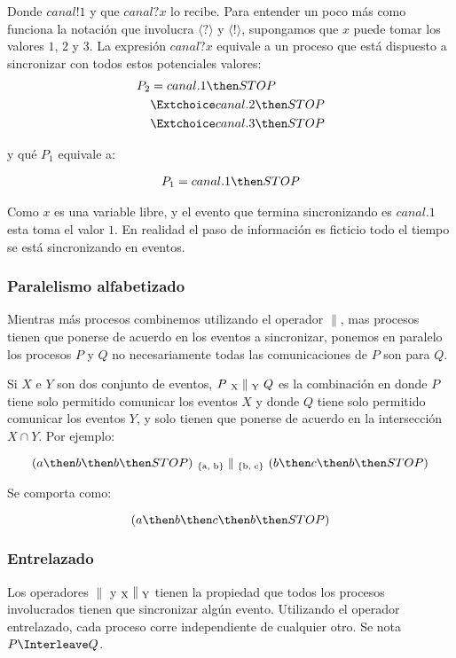 Donde $canal!1$ y que $canal?x$ lo recibe. Para entender un poco más como funciona la notación que involucra $\langle ? \rangle$ y $\langle ! \rangle$, supongamos que $x$ puede tomar los valores $1$, $2$ y $3$. La expresión $canal?x$ equivale a un proceso que está dispuesto a sincronizar con todos estos potenciales valores:
\begin{align*}
P_2 & =  canal.1 \then STOP \\
      & \Extchoice canal.2 \then STOP \\
      & \Extchoice canal.3 \then STOP 
\end{align*}

y qué $P_1$ equivale a: 

\begin{align*}
P_1  = canal.1 \then STOP \\
\end{align*}

Como $x$ es una variable libre, y el evento que termina sincronizando es $canal.1$ esta toma el valor $1$. En realidad el paso de información es ficticio todo el tiempo se está sincronizando en eventos.

\subsubsection*{Paralelismo alfabetizado}

Mientras más procesos combinemos utilizando el operador $\parallel$, mas procesos tienen que ponerse de acuerdo en los eventos a sincronizar, ponemos en paralelo los procesos $P$ y $Q$ no necesariamente todas las comunicaciones de $P$ son para $Q$.

Si $X$ e $Y$ son dos conjunto de eventos, $P\ \textsubscript{X}\parallel\textsubscript{Y}\ Q$ es la combinación en donde $P$ tiene solo permitido comunicar los eventos $X$ y donde $Q$ tiene solo permitido comunicar los eventos $Y$, y solo tienen que ponerse de acuerdo en la intersección $X \cap Y$. Por ejemplo:

\[ 
 ( a \then b \then b \then STOP )\  \textsubscript{\{a, b\}} \parallel \textsubscript{\{b, c\}}\ ( b \then c \then b \then STOP ) 
\]

Se comporta como:

\[ 
 ( a \then b \then c \then b \then STOP )
\]

\subsubsection*{Entrelazado}
Los operadores $\parallel$ y $\textsubscript{X}\parallel\textsubscript{Y}$ tienen la propiedad que todos los procesos involucrados tienen que sincronizar algún evento. Utilizando el operador entrelazado, cada proceso corre independiente de cualquier otro. Se nota $P \Interleave Q$.

